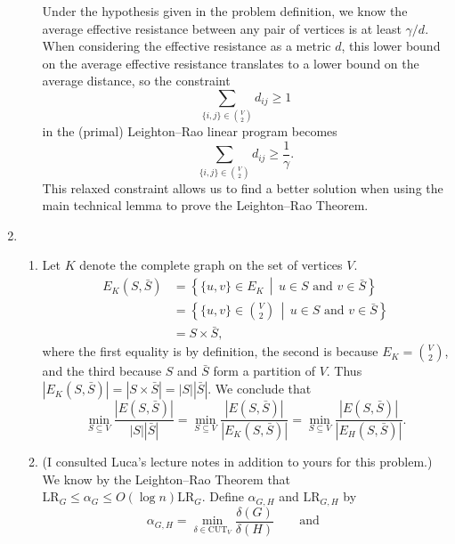 \documentclass{article}
\newcommand{\CUT}{\mathrm{CUT}}
\newcommand{\LR}{\mathrm{LR}}
\newcommand{\0}{\mathbf{0}}
\begin{document}
\begin{enumerate}
\begin{enumerate}
    Under the hypothesis given in the problem definition, we know the average effective resistance between any pair of vertices is at least $\gamma / d$.
    When considering the effective resistance as a metric $d$, this lower bound on the average effective resistance translates to a lower bound on the average distance, so the constraint
    \begin{equation*}
      \sum_{\{i, j\} \in \binom{V}{2}} d_{ij} \geq 1
    \end{equation*}
    in the (primal) Leighton--Rao linear program becomes
    \begin{equation*}
      \sum_{\{i, j\} \in \binom{V}{2}} d_{ij} \geq \frac{1}{\gamma}.
    \end{equation*}
    This relaxed constraint allows us to find a better solution when using the main technical lemma to prove the Leighton--Rao Theorem.
  \end{enumerate}
\item
  \begin{enumerate}
  \item Let $K$ denote the complete graph on the set of vertices $V$.
    \begin{align*}
      E_K(S, \bar{S}) & = \left\{ \{u, v\} \in E_K \, \middle| \, u \in S \text{ and } v \in \bar{S}\right\} \\
      & = \left\{ \{u, v\} \in \binom{V}{2} \, \middle| \, u \in S \text{ and } v \in \bar{S}\right\} \\
      & = S \times \bar{S},
    \end{align*}
    where the first equality is by definition, the second is because $E_K = \binom{V}{2}$, and the third because $S$ and $\bar{S}$ form a partition of $V$.
    Thus $|E_K(S, \bar{S})| = |S \times \bar{S}| = |S| |\bar{S}|$.
    We conclude that
    \begin{equation*}
      \min_{S \subseteq V} \frac{|E(S, \bar{S})|}{|S| |\bar{S}|}
      =
      \min_{S \subseteq V} \frac{|E(S, \bar{S})|}{|E_K(S, \bar{S})|}
      =
      \min_{S \subseteq V} \frac{|E(S, \bar{S})|}{|E_H(S, \bar{S})|}.
    \end{equation*}
  \item (I consulted Luca's lecture notes in addition to yours for this problem.)
    We know by the Leighton--Rao Theorem that $\LR_G \leq \alpha_G \leq O(\log n) \LR_G$.
    Define $\alpha_{G, H}$ and $\LR_{G, H}$ by
    \begin{equation*}
      \alpha_{G, H} = \min_{\delta \in \CUT_V} \frac{\delta(G)}{\delta(H)}
      \qquad \text{and} \qquad

\end{equation*}
\end{enumerate}
\end{enumerate}
\end{document}
